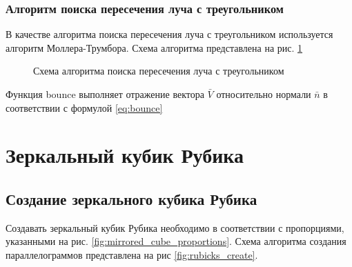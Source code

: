 \documentclass[a4paper, 14pt]{report} %
\begin{document}
	\subsubsection{Алгоритм поиска пересечения луча с треугольником}
	В качестве алгоритма поиска пересечения луча с треугольником используется алгоритм Моллера-Трумбора\cite{mollertrumbor}. Схема алгоритма представлена на рис. \ref{fig:triangle_intersec}
	\begin{figure}[!ht]
		\caption{Схема алгоритма поиска пересечения луча с треугольником}
		\label{fig:triangle_intersec}
	\end{figure}

	Функция bounce выполняет отражение вектора $\bar V$ относительно нормали $\bar n$ в соответствии с формулой \ref{eq:bounce}
	\section{Зеркальный кубик Рубика}
	\subsection{Создание зеркального кубика Рубика}
	Создавать зеркальный кубик Рубика необходимо в соответствии с пропорциями, указанными на рис. \ref{fig:mirrored_cube_proportions}. Схема алгоритма создания параллелограммов представлена на рис \ref{fig:rubicks_create}.
	
\end{document}
